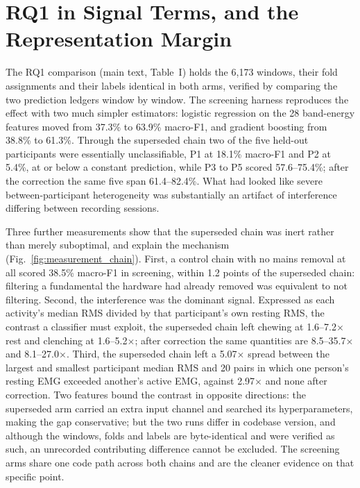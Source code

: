 \documentclass[journal]{IEEEtran}
\begin{document}
\section{RQ1 in Signal Terms, and the Representation Margin}
\label{sec:s_rq1}

The RQ1 comparison (main text, Table~I) holds the 6,173 windows, their fold assignments and their labels identical in both arms, verified by comparing the two prediction ledgers window by window. The screening harness reproduces the effect with two much simpler estimators: logistic regression on the 28 band-energy features moved from 37.3\% to 63.9\% macro-F1, and gradient boosting from 38.8\% to 61.3\%. Through the superseded chain two of the five held-out participants were essentially unclassifiable, P1 at 18.1\% macro-F1 and P2 at 5.4\%, at or below a constant prediction, while P3 to P5 scored 57.6--75.4\%; after the correction the same five span 61.4--82.4\%. What had looked like severe between-participant heterogeneity was substantially an artifact of interference differing between recording sessions.

Three further measurements show that the superseded chain was inert rather than merely suboptimal, and explain the mechanism (Fig.~\ref{fig:measurement_chain}). First, a control chain with no mains removal at all scored 38.5\% macro-F1 in screening, within 1.2 points of the superseded chain: filtering a fundamental the hardware had already removed was equivalent to not filtering. Second, the interference was the dominant signal. Expressed as each activity's median RMS divided by that participant's own resting RMS, the contrast a classifier must exploit, the superseded chain left chewing at 1.6--7.2$\times$ rest and clenching at 1.6--5.2$\times$; after correction the same quantities are 8.5--35.7$\times$ and 8.1--27.0$\times$. Third, the superseded chain left a 5.07$\times$ spread between the largest and smallest participant median RMS and 20 pairs in which one person's resting EMG exceeded another's active EMG, against 2.97$\times$ and none after correction. Two features bound the contrast in opposite directions: the superseded arm carried an extra input channel and searched its hyperparameters, making the gap conservative; but the two runs differ in codebase version, and although the windows, folds and labels are byte-identical and were verified as such, an unrecorded contributing difference cannot be excluded. The screening arms share one code path across both chains and are the cleaner evidence on that specific point.
\end{document}

